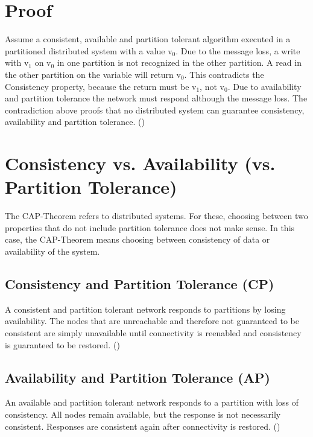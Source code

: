\section*{Proof}
Assume a consistent, available and partition tolerant algorithm executed in a partitioned distributed system with a value v$_{0}$. Due to the message loss, a write with v$_{1}$ on v$_{0}$ in one partition is not recognized in the other partition. A read in the other partition on the variable will return v$_{0}$. This contradicts the Consistency property, because the return must be v$_{1}$, not v$_{0}$. Due to availability and partition tolerance the network must respond although the message loss. The contradiction above proofs that no distributed system can guarantee consistency, availability and partition tolerance. (\cite[p.~4ff.]{brewer:2002})
\section*{Consistency vs. Availability (vs. Partition Tolerance)}
The \acs{CAP}-Theorem refers to distributed systems. For these, choosing between two properties that do not include partition tolerance does not make sense. In this case, the \acs{CAP}-Theorem means choosing between consistency of data or availability of the system.
\subsection*{Consistency and Partition Tolerance (CP)}
A consistent and partition tolerant network responds to partitions by losing availability. The nodes that are unreachable and therefore not guaranteed to be consistent are simply unavailable until connectivity is reenabled and consistency is guaranteed to be restored. (\cite[p.~6]{brewer:2002})
\subsection*{Availability and Partition Tolerance (AP)}
An available and partition tolerant network responds to a partition with loss of consistency. All nodes remain available, but the response is not necessarily consistent. Responses are consistent again after connectivity is restored. (\cite[p.~6]{brewer:2002})
\pagebreak
